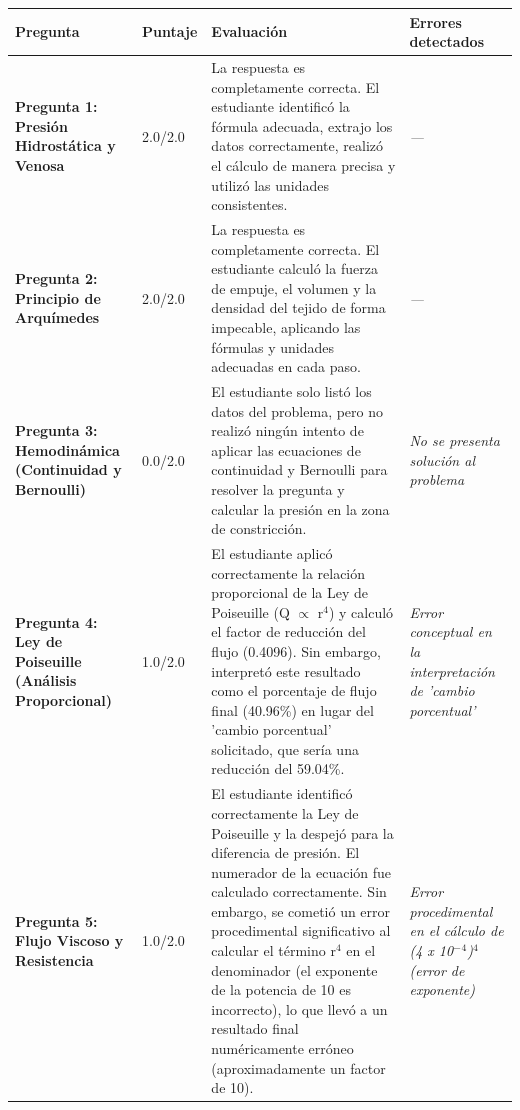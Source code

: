 \documentclass[11pt,a4paper]{article}
\begin{document}
\begin{longtable}{>{\bfseries}p{2.8cm} p{1.6cm} p{7.0cm} p{2.8cm}}
  \toprule
  \textbf{Pregunta} & \textbf{Puntaje} & \textbf{Evaluación} & \textbf{Errores detectados} \\
  \midrule
  \endhead
  \bottomrule
  \endfoot
    \textbf{Pregunta 1: Presión Hidrostática y Venosa} & 2.0/2.0 & La respuesta es completamente correcta. El estudiante identificó la fórmula adecuada, extrajo los datos correctamente, realizó el cálculo de manera precisa y utilizó las unidades consistentes. & \textit{---} \\
    \midrule
    \textbf{Pregunta 2: Principio de Arquímedes} & 2.0/2.0 & La respuesta es completamente correcta. El estudiante calculó la fuerza de empuje, el volumen y la densidad del tejido de forma impecable, aplicando las fórmulas y unidades adecuadas en cada paso. & \textit{---} \\
    \midrule
    \textbf{Pregunta 3: Hemodinámica (Continuidad y Bernoulli)} & 0.0/2.0 & El estudiante solo listó los datos del problema, pero no realizó ningún intento de aplicar las ecuaciones de continuidad y Bernoulli para resolver la pregunta y calcular la presión en la zona de constricción. & \textit{No se presenta solución al problema} \\
    \midrule
    \textbf{Pregunta 4: Ley de Poiseuille (Análisis Proporcional)} & 1.0/2.0 & El estudiante aplicó correctamente la relación proporcional de la Ley de Poiseuille (Q $\propto$ r$^{4}$) y calculó el factor de reducción del flujo (0.4096). Sin embargo, interpretó este resultado como el porcentaje de flujo final (40.96\%) en lugar del 'cambio porcentual' solicitado, que sería una reducción del 59.04\%. & \textit{Error conceptual en la interpretación de 'cambio porcentual'} \\
    \midrule
    \textbf{Pregunta 5: Flujo Viscoso y Resistencia} & 1.0/2.0 & El estudiante identificó correctamente la Ley de Poiseuille y la despejó para la diferencia de presión. El numerador de la ecuación fue calculado correctamente. Sin embargo, se cometió un error procedimental significativo al calcular el término r$^{4}$ en el denominador (el exponente de la potencia de 10 es incorrecto), lo que llevó a un resultado final numéricamente erróneo (aproximadamente un factor de 10). & \textit{Error procedimental en el cálculo de (4 x 10$^{-}$$^{4}$)$^{4}$ (error de exponente)} \\
    \midrule
\end{longtable}
\end{document}
